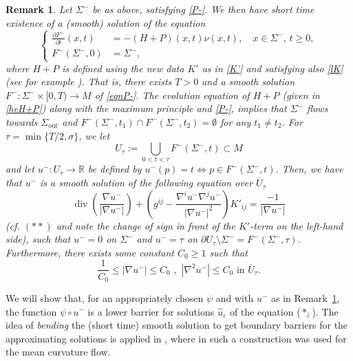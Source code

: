 \documentclass[11pt]{amsart}
\newtheorem{Remark}[Theorem]{Remark}
\renewcommand{\epsilon}{\varepsilon}
\DeclareMathOperator{\dvg}{div} \DeclareMathOperator{\spt}{spt}
\def\R{\mathbb{R}}
\def\e{\epsilon}
\def\t{\tau}
\def\s{\sigma}
\def\ov{\overline}
\def\out{\text{out}}
\begin{document}
\begin{Remark}\label{SUrmk} Let $\Sigma^-$ be as above,  satisfying \eqref{P-}. We then have short time existence of a (smooth) solution of the equation
\begin{equation}\label{eqnP-}
\left\lbrace
\begin{aligned}
 \frac{\partial F^-}{\partial t}(x,t) & = -(H+P)(x,t)\nu(x,t), \quad x\in\Sigma^-,\,t\geq0, \\
                         F^-(\Sigma^-,0) & = \Sigma^-,
\end{aligned}
\right.
\end{equation}
where $H+P$ is defined using the new data $K'$ as in  \eqref{K'} and satisfying also \eqref{lK} (see for example \cite{CB, GP99}). That is, there exists $T>0$ and a smooth solution  $F^-:\Sigma^-\times[0,T)\to M$
of  \eqref{eqnP-}. The evolution equation of $H+ P$ (given  in \eqref{heH+P}) along
with  the maximum principle and \eqref{P-}, implies that $\Sigma^-$ flows towards $\Sigma_\out$ and
 $F^-(\Sigma^-, {t_1})\cap F^-(\Sigma^-, {t_2})=\emptyset$ for any $t_1\ne t_2$. For $\tau=\min\{T/2,\s\}$, we let 
 \[ U_\t:=\bigcup_{0<t<\tau}F^-(\Sigma^-, {t})\subset M\]
and let $u^-:U_\t\to \R$ be defined by $u^-(p)=t\Leftrightarrow p\in F^-(\Sigma^-, {t})$. Then, we have that $u^-$ is a smooth solution of the following equation over $\ov U_\t$ 
\begin{equation}\label{ellH+Ps}
\dvg\left( \frac{\nabla u^-}{|\nabla u^-|}\right) +\left(g^{ij}-\dfrac{\nabla^iu^-\nabla^ju^-}{|\nabla u^-|^2}\right)K'_{ij}= \frac{-1}{|\nabla u^-|}
\end{equation}
(cf. $(**)$ and note the change of sign in front of the $K'$-term on the left-hand side), such that $u^-=0$ on $\Sigma^-$ and $u^-=\tau$ on $\partial U_\t\setminus\Sigma^-=F^-(\Sigma^-, \tau)$. Furthermore, there exists some constant $C_0\ge1$ such that
\begin{equation}\label{Dus}
\frac{1}{C_0}\le |\nabla u^-|\le C_0\,\,,\,\,|\nabla^2 u^-|\le C_0\text{    in   }\ov U_\t.
\end{equation}

\end{Remark}

We will show that, for an appropriately chosen $\psi$ and with $u^-$ as in Remark~\ref{SUrmk}, the function $\psi\circ u^-$ is a lower barrier for solutions $\hat u_{\e}$ of the equation (${*_{\hat{\varepsilon}}}$).
The idea of {\it bending} the (short time) smooth solution to get boundary barriers for the approximating solutions is applied in  \cite{S08}, where in \cite[Lemma 4.2]{S08} such a construction was used for the mean curvature flow.
\end{document}
